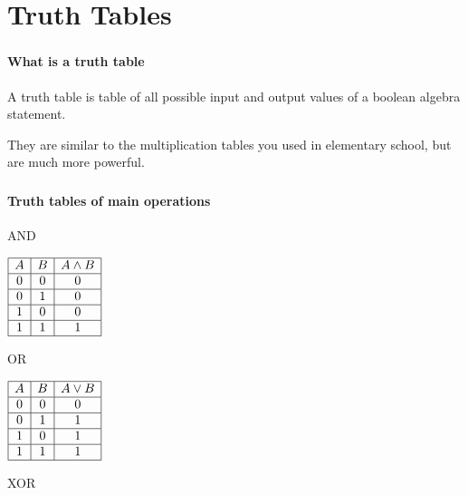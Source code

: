 \documentclass[mathserif]{beamer}
\newenvironment{namedframe}[1]%
	{\begin{frame}\frametitle{\secname}\framesubtitle{#1}}
	{\end{frame}}
\begin{document}
	\section{Truth Tables}
	\begin{namedframe}{What is a truth table}
		A truth table is table of all possible input and output values of a boolean algebra statement.
		\pause

		They are similar to the multiplication tables you used in elementary school, but are much more powerful.
	\end{namedframe}
	\begin{namedframe}{Truth tables of main operations}
		\begin{center}
			\begin{minipage}[t]{0.45\textwidth}
				\pause
				\begin{table}
					\caption{AND}
					\begin{math}
						\begin{array}{|c|c|c|}
							\hline
							A & B & A \wedge B\\\hline
							0 & 0 & 0\\\hline
							0 & 1 & 0\\\hline
							1 & 0 & 0\\\hline
							1 & 1 & 1\\\hline
						\end{array}
					\end{math}
				\end{table}
				\vspace{\baselineskip}
				\pause
				\begin{table}
					\caption{OR}
					\begin{math}
						\begin{array}{|c|c|c|}
							\hline
							A & B & A \vee B\\\hline
							0 & 0 & 0\\\hline
							0 & 1 & 1\\\hline
							1 & 0 & 1\\\hline
							1 & 1 & 1\\\hline
						\end{array}
					\end{math}
				\end{table}
			\end{minipage}
			\begin{minipage}[t]{0.45\textwidth}
				\pause
				\begin{table}
					\caption{XOR}
					\begin{math}

\end{math}
\end{table}
\end{minipage}
\end{center}
\end{namedframe}
\end{document}
